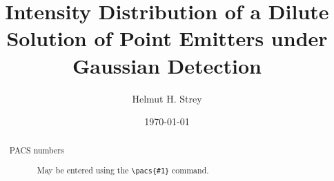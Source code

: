 \documentclass[%
 reprint,
 amsmath,amssymb,
 aps,
]{revtex4-1}
\begin{document}

\title{Intensity Distribution of a Dilute Solution of Point Emitters under Gaussian Detection}

\author{Helmut H. Strey}

\date{\today}%

\begin{abstract}
\begin{description}
\item[PACS numbers]
May be entered using the \verb+\pacs{#1}+ command.
\end{description}
\end{abstract}

\maketitle

\onecolumngrid
\end{document}
